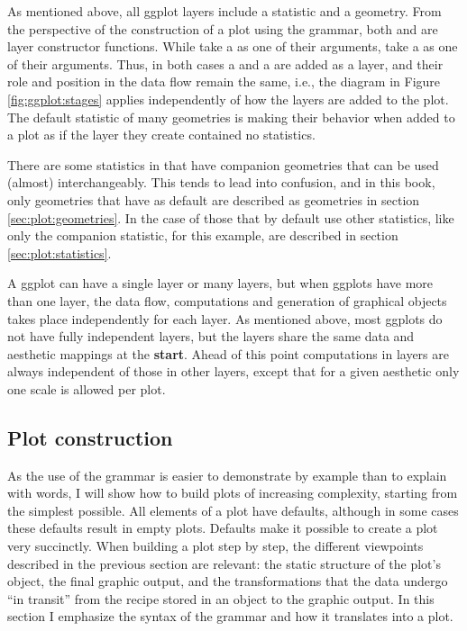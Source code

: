 \documentclass[krantz2]{krantz}\usepackage{knitr}
\begin{document}
\begin{warningbox}
As mentioned above, all ggplot layers include a statistic and a geometry. From the perspective of the construction of a plot using the grammar, both  and  are layer constructor functions. While  take a  as one of their arguments,  take a  as one of their arguments. Thus, in both cases a  and a  are added as a layer, and their role and position in the data flow remain the same, i.e., the diagram in Figure \ref{fig:ggplot:stages} applies independently of how the layers are added to the plot. The default statistic of many geometries is  making their behavior when added to a plot as if the layer they create contained no statistics.
\end{warningbox}

There are some statistics in  that have companion geometries that can be used (almost) interchangeably. This tends to lead into confusion, and in this book, only geometries that have as default  are described as geometries in section \ref{sec:plot:geometries}. In the case of those that by default use other statistics, like  only the companion statistic,  for this example, are described in section \ref{sec:plot:statistics}.

A ggplot can have a single layer or many layers, but when ggplots have more than one layer, the data flow, computations and generation of graphical objects takes place independently for each layer. As mentioned above, most ggplots do not have fully independent layers, but the layers share the same data and aesthetic mappings at the \textbf{start}. Ahead of this point computations in layers are always independent of those in other layers, except that for a given aesthetic only one scale is allowed per plot.


\subsection{Plot construction}

As the use of the grammar is easier to demonstrate by example than to explain with words, I will show how to build plots of increasing complexity, starting from the simplest possible. All elements of a plot have defaults, although in some cases these defaults result in empty plots. Defaults make it possible to create a plot very succinctly. When building a plot step by step, the different viewpoints described in the previous section are relevant: the static structure of the plot's \Rlang object, the final graphic output, and the transformations that the data undergo ``in transit'' from the recipe stored in an object to the graphic output. In this section I emphasize the syntax of the grammar and how it translates into a plot.
\end{document}
